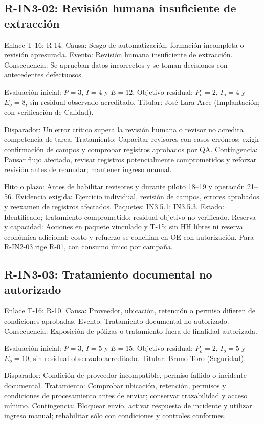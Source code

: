 \subsection{R-IN3-02: Revisión humana insuficiente de extracción}
Enlace T-16: R-14. Causa: Sesgo de automatización, formación incompleta o revisión apresurada. Evento: Revisión humana insuficiente de extracción. Consecuencia: Se aprueban datos incorrectos y se toman decisiones con antecedentes defectuosos.

Evaluación inicial: $P=3$, $I=4$ y $E=12$. Objetivo residual: $P_o=2$, $I_o=4$ y $E_o=8$, sin residual observado acreditado. Titular: José Lara Arce (Implantación; con verificación de Calidad).

Disparador: Un error crítico supera la revisión humana o revisor no acredita competencia de tarea. Tratamiento: Capacitar revisores con casos erróneos; exigir confirmación de campos y comprobar registros aprobados por QA. Contingencia: Pausar flujo afectado, revisar registros potencialmente comprometidos y reforzar revisión antes de reanudar; mantener ingreso manual.

Hito o plazo: Antes de habilitar revisores y durante piloto 18--19 y operación 21--56. Evidencia exigida: Ejercicio individual, revisión de campos, errores aprobados y reexamen de registros afectados. Paquetes: IN3.5.1; IN3.5.3. Estado: Identificado; tratamiento comprometido; residual objetivo no verificado. Reserva y capacidad: Acciones en paquete vinculado y T-15; sin HH libres ni reserva económica adicional; costo y refuerzo se concilian en OE con autorización. Para R-IN2-03 rige R-01, con consumo único por campaña.

\subsection{R-IN3-03: Tratamiento documental no autorizado}
Enlace T-16: R-10. Causa: Proveedor, ubicación, retención o permiso difieren de condiciones aprobadas. Evento: Tratamiento documental no autorizado. Consecuencia: Exposición de pólizas o tratamiento fuera de finalidad autorizada.

Evaluación inicial: $P=3$, $I=5$ y $E=15$. Objetivo residual: $P_o=2$, $I_o=5$ y $E_o=10$, sin residual observado acreditado. Titular: Bruno Toro (Seguridad).

Disparador: Condición de proveedor incompatible, permiso fallido o incidente documental. Tratamiento: Comprobar ubicación, retención, permisos y condiciones de procesamiento antes de enviar; conservar trazabilidad y acceso mínimo. Contingencia: Bloquear envío, activar respuesta de incidente y utilizar ingreso manual; rehabilitar sólo con condiciones y controles conformes.

